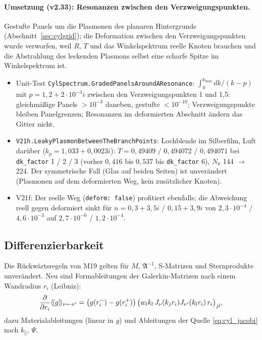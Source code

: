 \paragraph{Umsetzung (v2.33): Resonanzen zwischen den Verzweigungspunkten.}
Gestufte Panels um die Plasmonen des planaren Hintergrunds (Abschnitt~\ref{sec:cylgrid}); die Deformation zwischen den
Verzweigungspunkten wurde verworfen, weil $R$, $T$ und das Winkelspektrum reelle Knoten brauchen und die
Abstrahlung des leckenden Plasmons selbst eine scharfe Spitze im Winkelspektrum ist.
\begin{itemize}[nosep]
  \item Unit-Test \verb|CylSpectrum.GradedPanelsAroundAResonance|: $\int_0^{k_{\max}}dk/(k-p)$ mit
        $p=1{,}2+2\cdot10^{-3}i$ zwischen den Verzweigungspunkten 1 und 1{,}5: gleichmäßige Panels $>10^{-3}$ daneben,
        gestufte $<10^{-10}$; Verzweigungspunkte bleiben Panelgrenzen; Resonanzen im deformierten Abschnitt ändern das
        Gitter nicht.
  \item \verb|V21h.LeakyPlasmonBetweenTheBranchPoints|: Lochblende im Silberfilm, Luft darüber
        ($k_p=1{,}033+0{,}0023i$): $T=0{,}49409$ / $0{,}494072$ / $0{,}494071$ bei \verb|dk_factor| 1 / 2 / 3 (vorher
        $0{,}416$ bis $0{,}537$ bis \verb|dk_factor| 6), $N_k$ 144 $\to$ 224. Der symmetrische Fall (Glas auf beiden
        Seiten) ist unverändert (Plasmonen auf dem deformierten Weg, kein zusätzlicher Knoten).
  \item V21f: Der reelle Weg (\verb|deform: false|) profitiert ebenfalls; die Abweichung reell gegen deformiert sinkt
        für $n=0{,}3+3{,}5i$ / $0{,}15+3{,}9i$ von $2{,}3\cdot10^{-4}$ / $4{,}6\cdot10^{-3}$ auf $2{,}7\cdot10^{-6}$ /
        $1{,}2\cdot10^{-4}$.
\end{itemize}

\subsection{Differenzierbarkeit}
Die Rückwärtsregeln von M19 gelten für $M$, $\mathfrak A^{-1}$, S-Matrizen und Sternprodukte unverändert. Neu sind
Formableitungen der Galerkin-Matrizen nach einem Wandradius $r_i$ (Leibniz):
\begin{equation}
  \frac{\partial}{\partial r_i}\langle\!\langle g\rangle\!\rangle_{\nu\leftarrow\nu'}=\big(g(r_i^-)-g(r_i^+)\big)\,\big(w_lk_l\,J_\nu(k_jr_i)J_{\nu'}(k_lr_i)\,r_i\big)_{jl},
  \label{eq:cyl_shape}
\end{equation}
dazu Materialableitungen (linear in $g$) und Ableitungen der Quelle \eqref{eq:cyl_jacobi} nach $k_\parallel$, $\Psi$.

